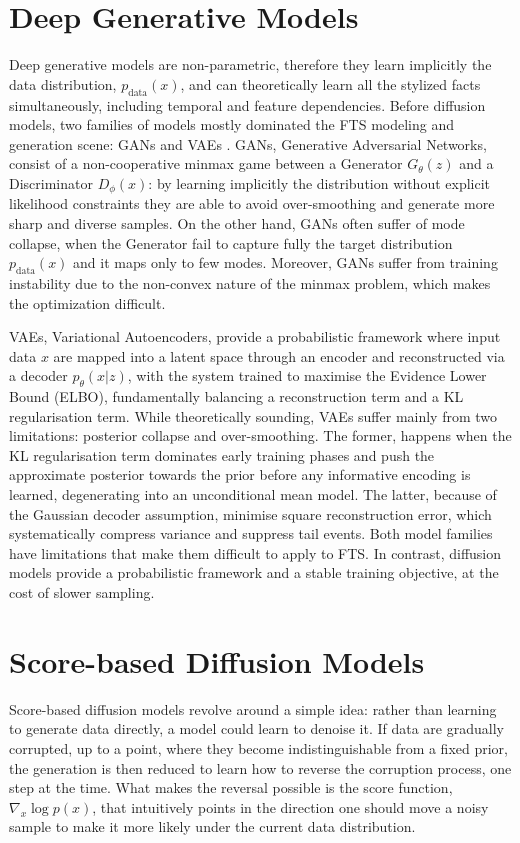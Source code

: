 \section{Deep Generative Models}
Deep generative models are non-parametric, therefore they learn implicitly the data distribution, \(p_{\text{data}}(x)\), and can theoretically learn all the stylized facts simultaneously, including temporal and feature dependencies. Before diffusion models, two families of models mostly dominated the FTS modeling and generation scene: GANs \cite{goodfellow2014generative, creswell2018generative,yoon2019time,vuletic2024fingan} and VAEs \cite{kingma2014auto, kingma2019introduction}. GANs, Generative Adversarial Networks, consist of a non-cooperative minmax game between a Generator \(G_\theta(z)\) and a Discriminator \(D_\phi(x)\): by learning implicitly the distribution without explicit likelihood constraints they are able to avoid over-smoothing and generate more sharp and diverse samples. On the other hand, GANs often suffer of mode collapse, when the Generator fail to capture fully the target distribution \(p_{\text{data}}(x)\) and it maps only to few modes. Moreover, GANs suffer from training instability due to the non-convex nature of the minmax problem, which makes the optimization difficult.

VAEs, Variational Autoencoders, provide a probabilistic framework where input data \(x\) are mapped into a latent space through an encoder and reconstructed via a decoder \(p_\theta(x|z)\), with the system trained to maximise the Evidence Lower Bound (ELBO), fundamentally balancing a reconstruction term and a KL regularisation term. While theoretically sounding, VAEs suffer mainly from two limitations: posterior collapse and over-smoothing. The former, happens when the KL regularisation term dominates early training phases and push the approximate posterior towards the prior before any informative encoding is learned, degenerating into an unconditional mean model. The latter, because of the Gaussian decoder assumption, minimise square reconstruction error, which systematically compress variance and suppress tail events. Both model families have limitations that make them difficult to apply to FTS. In contrast, diffusion models provide a probabilistic framework and a stable training objective, at the cost of slower sampling.

\section{Score-based Diffusion Models}
\label{sec:scorediffmodels}
Score-based diffusion models revolve around a simple idea: rather than learning to generate data directly, a model could learn to denoise it. If data are gradually corrupted, up to a point, where they become indistinguishable from a fixed prior, the generation is then reduced to learn how to reverse the corruption process, one step at the time. What makes the reversal possible is the score function,\(\nabla_x \log p(x)\), that intuitively points in the direction one should move a noisy sample to make it more likely under the current data distribution.

